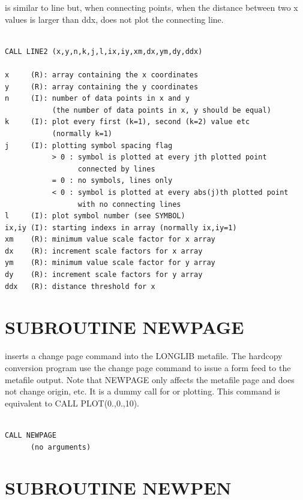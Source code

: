\documentclass[11pt]{report}
\begin{document}
 is similar to line but, when connecting points, when
the distance between two x values is larger than ddx, does not
plot the connecting line.
\begin{verbatim}

CALL LINE2 (x,y,n,k,j,l,ix,iy,xm,dx,ym,dy,ddx)

x     (R): array containing the x coordinates
y     (R): array containing the y coordinates
n     (I): number of data points in x and y
           (the number of data points in x, y should be equal)
k     (I): plot every first (k=1), second (k=2) value etc
           (normally k=1)
j     (I): plotting symbol spacing flag
           > 0 : symbol is plotted at every jth plotted point
                 connected by lines
           = 0 : no symbols, lines only
           < 0 : symbol is plotted at every abs(j)th plotted point
                 with no connecting lines
l     (I): plot symbol number (see SYMBOL)
ix,iy (I): starting indexs in array (normally ix,iy=1)
xm    (R): minimum value scale factor for x array
dx    (R): increment scale factors for x array
ym    (R): minimum value scale factor for y array
dy    (R): increment scale factors for y array
ddx   (R): distance threshold for x
\end{verbatim}


\section{SUBROUTINE NEWPAGE}

 inserts a change page command into the LONGLIB metafile.  The
hardcopy conversion program use the change page command to issue a form
feed to the metafile output.  Note that NEWPAGE only affects the metafile page
and does not change origin, etc.
It is a dummy call for  or  plotting.  This command is
equivalent to CALL PLOT(0.,0.,10).
\begin{verbatim}

CALL NEWPAGE
      (no arguments)
\end{verbatim}

\section{SUBROUTINE NEWPEN}
\end{document}
